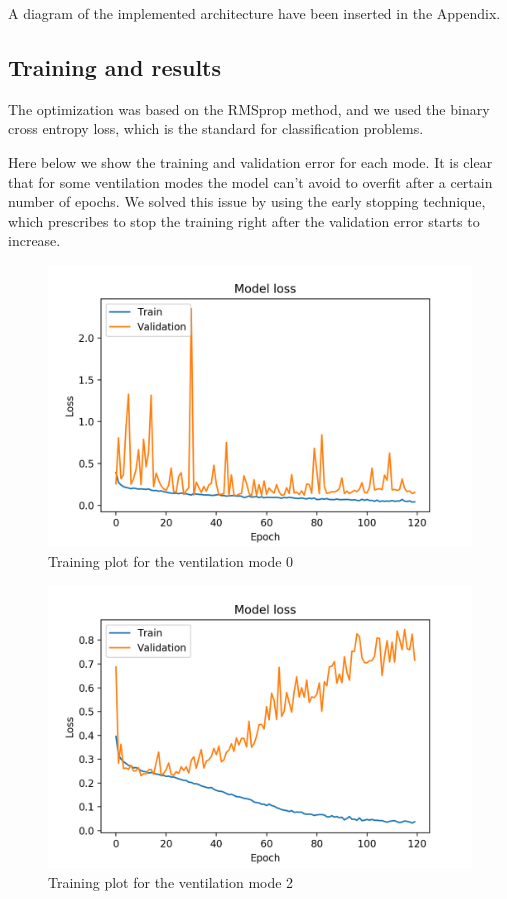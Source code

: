 \documentclass[a4paper, twoside]{article}
\begin{document}
A diagram of the implemented architecture have been inserted in the Appendix.

\subsection{Training and results}
The optimization was based on the RMSprop method, and we used the binary cross entropy loss, which is the standard for classification problems.

Here below we show the training and validation error for each mode. It is clear that for some ventilation modes the model can't avoid to overfit after a certain number of epochs. We solved this issue by using the early stopping technique, which prescribes to stop the training right after the validation error starts to increase.

    \begin{figure}[H]
        \centering
        \includegraphics[width=0.9\linewidth]{mode_0_conv_1.png}
        \caption{Training plot for the ventilation mode 0}
    \end{figure}

    \begin{figure}[H]
        \centering
        \includegraphics[width=0.9\linewidth]{mode_2_conv_1.png}
        \caption{Training plot for the ventilation mode 2}
    \end{figure}
\end{document}
